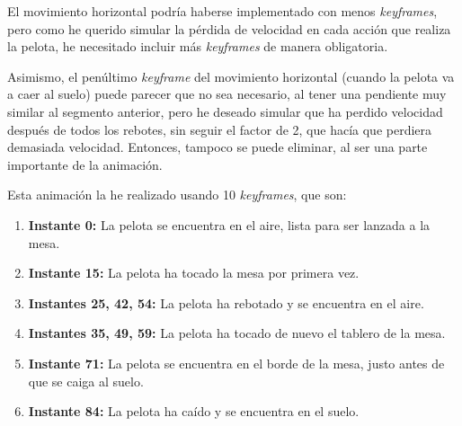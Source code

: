 \documentclass{article}
\begin{document}
\bigskip

El movimiento horizontal podría haberse implementado con menos \textit{keyframes}, pero como he querido simular la pérdida de velocidad en cada acción que realiza la pelota, he necesitado incluir más \textit{keyframes} de manera obligatoria. 

\bigskip

Asimismo, el penúltimo \textit{keyframe} del movimiento horizontal (cuando la pelota va a caer al suelo) puede parecer que no sea necesario, al tener una pendiente muy similar al segmento anterior, pero he deseado simular que ha perdido velocidad después de todos los rebotes, sin seguir el factor de 2, que hacía que perdiera demasiada velocidad. Entonces, tampoco se puede eliminar, al ser una parte importante de la animación.

\bigskip

Esta animación la he realizado usando 10 \textit{keyframes}, que son:

\begin{enumerate}
    \item \textbf{Instante 0:} La pelota se encuentra en el aire, lista para ser lanzada a la mesa.
    \item \textbf{Instante 15:} La pelota ha tocado la mesa por primera vez.
    \item \textbf{Instantes 25, 42, 54:} La pelota ha rebotado y se encuentra en el aire.
    \item \textbf{Instantes 35, 49, 59:} La pelota ha tocado de nuevo el tablero de la mesa.
    \item \textbf{Instante 71:} La pelota se encuentra en el borde de la mesa, justo antes de que se caiga al suelo.
    \item \textbf{Instante 84:} La pelota ha caído y se encuentra en el suelo.
\end{enumerate}

\bigskip
\end{document}
